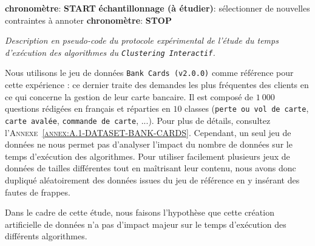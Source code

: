 \begin{algorithm}
{{						\textbf{chronomètre}: \textbf{START} \;
						\textbf{échantillonnage (à étudier)}: sélectionner de nouvelles contraintes à annoter \;
						\textbf{chronomètre}: \textbf{STOP} \;
					}
				}
				\caption{\textit{
					Description en pseudo-code du protocole expérimental de l'étude du temps d'exécution des algorithmes du \texttt{Clustering Interactif}.
				}}
				\label{algorithm:4.3.2-ETUDE-COUTS-TEMPS-CALCUL-PROTOCOLE}
			\end{algorithm}
			
			Nous utilisons le jeu de données \texttt{Bank Cards (v2.0.0)} comme référence pour cette expérience : ce dernier traite des demandes les plus fréquentes des clients en ce qui concerne la gestion de leur carte bancaire.
			Il est composé de $1~000$ questions rédigées en français et réparties en $10$ classes (\texttt{perte ou vol de carte}, \texttt{carte avalée}, \texttt{commande de carte}, ...).
			Pour plus de détails, consultez l'\textsc{Annexe~\ref{annex:A.1-DATASET-BANK-CARDS}}.
			Cependant, un seul jeu de données ne nous permet pas d'analyser l'impact du nombre de données sur le temps d'exécution des algorithmes.
			Pour utiliser facilement plusieurs jeux de données de tailles différentes tout en maîtrisant leur contenu, nous avons donc dupliqué aléatoirement des données issues du jeu de référence en y insérant des fautes de frappes.
			
			\begin{leftBarWarning}
				Dans le cadre de cette étude, nous faisons l'hypothèse que cette création artificielle de données n'a pas d'impact majeur sur le temps d'exécution des différents algorithmes.
			\end{leftBarWarning}
			
